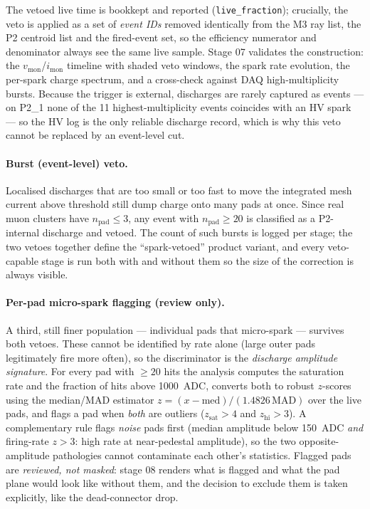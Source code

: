 \documentclass[11pt,a4paper]{article}
\newcommand{\detone}{P2\_1}
\newcommand{\code}[1]{\texttt{#1}}
\begin{document}
The vetoed live time is bookkept and reported
(\code{live\_fraction}); crucially, the veto is applied as a set of
\emph{event IDs} removed identically from the M3 ray list, the P2 centroid
list and the fired-event set, so the efficiency numerator and denominator
always see the same live sample. Stage 07 validates the construction: the
$v_\text{mon}$/$i_\text{mon}$ timeline with shaded veto windows, the spark
rate evolution, the per-spark charge spectrum, and a cross-check against DAQ
high-multiplicity bursts. Because the trigger is external, discharges are
rarely captured as events --- on \detone{} none of the 11 highest-multiplicity
events coincides with an HV spark --- so the HV log is the only reliable
discharge record, which is why this veto cannot be replaced by an event-level
cut.

\paragraph{Burst (event-level) veto.}
Localised discharges that are too small or too fast to move the integrated
mesh current above threshold still dump charge onto many pads at once. Since
real muon clusters have $n_\text{pad} \le 3$, any event with
$n_\text{pad} \ge 20$ is classified as a P2-internal discharge and vetoed.
The count of such bursts is logged per stage; the two vetoes together define
the ``spark-vetoed'' product variant, and every veto-capable stage is run
both with and without them so the size of the correction is always visible.

\paragraph{Per-pad micro-spark flagging (review only).}
A third, still finer population --- individual pads that micro-spark ---
survives both vetoes. These cannot be identified by rate alone (large outer
pads legitimately fire more often), so the discriminator is the
\emph{discharge amplitude signature}. For every pad with $\ge 20$ hits the
analysis computes the saturation rate and the fraction of hits above
\SI{1000}{ADC}, converts both to robust $z$-scores using the median/MAD
estimator $z = (x - \mathrm{med})/(1.4826\,\mathrm{MAD})$ over the live
pads, and flags a pad when \emph{both} are outliers
($z_\text{sat} > 4$ and $z_\text{hi} > 3$). A complementary rule flags
\emph{noise} pads first (median amplitude below \SI{150}{ADC} \emph{and}
firing-rate $z > 3$: high rate at near-pedestal amplitude), so the two
opposite-amplitude pathologies cannot contaminate each other's statistics.
Flagged pads are \emph{reviewed, not masked}: stage 08 renders what is
flagged and what the pad plane would look like without them, and the
decision to exclude them is taken explicitly, like the dead-connector drop.
\end{document}
